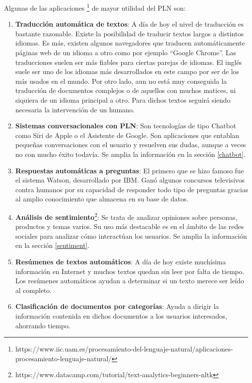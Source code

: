 Algunas de las aplicaciones \footnote{https://www.iic.uam.es/procesamiento-del-lenguaje-natural/aplicaciones-procesamiento-lenguaje-natural/} de mayor utilidad del PLN son:

\begin{enumerate}
	\item \textbf{Traducción automática de textos}: A día de hoy el nivel de traducción es bastante razonable. Existe la posibilidad de traducir textos largos a distintos idiomas. Es más, existen algunos navegadores que traducen automáticamente páginas web de un idioma a otro como por ejemplo ``Google Chrome''. Las traducciones suelen ser más fiables para ciertas parejas de idiomas. El inglés suele ser uno de los idiomas más desarrollados en este campo por ser de los más usados en el mundo. Por otro lado, aun no está muy conseguida la traducción de documentos complejos o de aquellos con muchos matices, ni siquiera de un idioma principal a otro. Para dichos textos seguirá siendo necesaria la intervención de un humano.
	\item \textbf{Sistemas conversacionales con PLN}: Son tecnologías de tipo Chatbot como Siri de Apple o el Asistente de Google. Son aplicaciones que entablan pequeñas conversaciones con el usuario y resuelven sus dudas, aunque a veces no con mucho éxito todavía. Se amplia la información en la sección \ref{chatbot}.
	\item \textbf{Respuestas automáticas a preguntas}: El primero que se hizo famoso fue el sistema Watson, desarrollado por IBM. Ganó algunos concursos televisivos contra humanos por su capacidad de responder todo tipo de preguntas gracias al amplio conocimiento que almacena en su base de datos.
	\item \textbf{Análisis de sentimiento}\footnote{https://www.datacamp.com/tutorial/text-analytics-beginners-nltk}: Se trata de analizar opiniones sobre personas, productos y temas varios. Su uso más destacable es en el ámbito de las redes sociales para analizar cómo interactúan los usuarios. Se amplia la información en la sección \ref{sentiment}.
	\item \textbf{Resúmenes de textos automáticos}: A día de hoy existe muchísima  información en Internet y muchos textos quedan sin leer por falta de tiempo. Los resúmenes automáticos ayudan a determinar si un texto merece ser leído al completo. 
	\item \textbf{Clasificación de documentos por categorías}: Ayuda a dirigir la información contenida en dichos documentos a los usuarios interesados, ahorrando tiempo. 
\end{enumerate}

